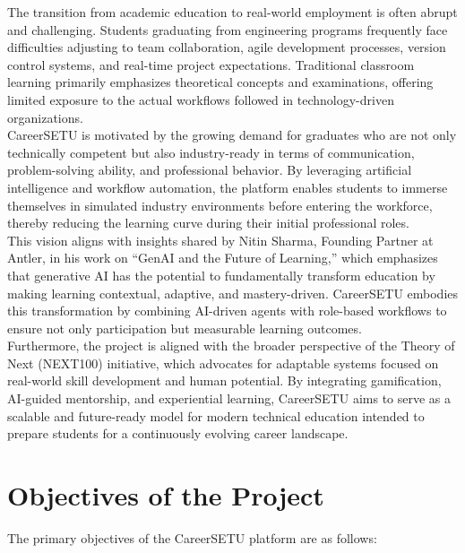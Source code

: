 \documentclass[12pt,a4paper]{report}
\begin{document}
The transition from academic education to real-world employment is often abrupt and
challenging. Students graduating from engineering programs frequently face difficulties
adjusting to team collaboration, agile development processes, version control systems,
and real-time project expectations. Traditional classroom learning primarily emphasizes
theoretical concepts and examinations, offering limited exposure to the actual workflows
followed in technology-driven organizations.\\[0.1cm]

CareerSETU is motivated by the growing demand for graduates who are not only technically
competent but also industry-ready in terms of communication, problem-solving ability,
and professional behavior. By leveraging artificial intelligence and workflow automation,
the platform enables students to immerse themselves in simulated industry environments
before entering the workforce, thereby reducing the learning curve during their initial
professional roles.\\[0.1cm]

This vision aligns with insights shared by Nitin Sharma, Founding Partner at Antler, in
his work on “GenAI and the Future of Learning,” which emphasizes that generative AI has
the potential to fundamentally transform education by making learning contextual,
adaptive, and mastery-driven. CareerSETU embodies this transformation by combining
AI-driven agents with role-based workflows to ensure not only participation but measurable
learning outcomes.\\[0.1cm]

Furthermore, the project is aligned with the broader perspective of the Theory of Next
(NEXT100) initiative, which advocates for adaptable systems focused on real-world skill
development and human potential. By integrating gamification, AI-guided mentorship, and
experiential learning, CareerSETU aims to serve as a scalable and future-ready model for
modern technical education intended to prepare students for a continuously evolving
career landscape.
\newpage
\section{Objectives of the Project}

The primary objectives of the CareerSETU platform are as follows:
\end{document}

